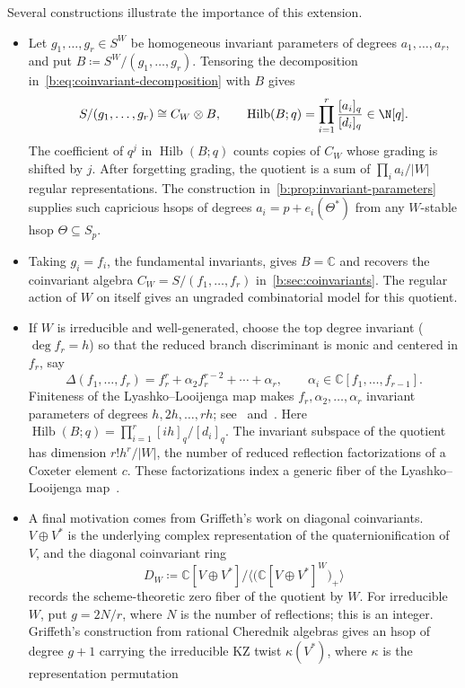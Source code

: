 \documentclass[10pt,a4paper]{amsart}
\newcommand{\defeq}{\coloneqq}
\theoremstyle{definition}
\newcommand{\C}{\mathbb C}\newcommand{\Q}{\mathbb Q}
\DeclareMathOperator{\Hilb}{Hilb}\DeclareMathOperator{\Res}{Res}
\begin{document}
Several constructions illustrate the importance of this extension.
\begin{itemize}
\item Let $g_1,\ldots,g_r\in S^W$ be homogeneous invariant parameters
of degrees $a_1,\ldots,a_r$, and put
$B\defeq S^W/(g_1,\ldots,g_r)$. Tensoring the decomposition
in~\cref{b:eq:coinvariant-decomposition} with $B$ gives
\[
 S/(g_1,\ldots,g_r)\cong C_W\otimes B,\qquad
 \Hilb(B;q)=\prod_{i=1}^r\frac{[a_i]_q}{[d_i]_q}\in\N[q].
\]
The coefficient of $q^j$ in $\Hilb(B;q)$ counts copies of $C_W$
whose grading is shifted by $j$. After forgetting grading, the
quotient is a sum of $\prod_i a_i/|W|$ regular representations.
The construction in~\cref{b:prop:invariant-parameters} supplies such
capricious hsops of degrees $a_i=p+e_i(\Theta^*)$ from any
$W$-stable hsop $\Theta\subseteq S_p$.
\item Taking $g_i=f_i$, the fundamental invariants, gives $B=\C$
and recovers the coinvariant algebra $C_W=S/(f_1,\ldots,f_r)$
in~\cref{b:sec:coinvariants}. The regular action of $W$ on itself
gives an ungraded combinatorial model for this quotient.
\item If $W$ is irreducible and well-generated, choose the top degree
invariant ($\deg f_r=h$) so that the reduced branch discriminant
is monic and centered in $f_r$, say
\[
 \Delta(f_1,\ldots,f_r)
 =f_r^r+\alpha_2f_r^{r-2}+\cdots+\alpha_r,
 \qquad \alpha_i\in\C[f_1,\ldots,f_{r-1}].
\]
Finiteness of the Lyashko--Looijenga map makes
$f_r,\alpha_2,\ldots,\alpha_r$ invariant parameters of degrees
$h,2h,\ldots,rh$; see~\cite[Section~7.2]{EquivariantParameters}
and~\cite[Lemma~4.4]{DouvropoulosLL}.
Here $\Hilb(B;q)=\prod_{i=1}^r[ih]_q/[d_i]_q$.
The invariant subspace of the quotient has dimension $r!h^r/|W|$,
the number of reduced reflection factorizations of a Coxeter element $c$.
These factorizations index a generic fiber of the Lyashko--Looijenga
map~\cite[Theorem~7.20]{Bessis}.
\item A final motivation comes from Griffeth's work on diagonal coinvariants.
$V\oplus V^*$ is the underlying complex representation of the
quaternionification of $V$, and the diagonal coinvariant ring
\[
 D_W\defeq\C[V\oplus V^*]\big/
 \big\langle\bigl(\C[V\oplus V^*]^W\bigr)_+\big\rangle
\]
records the scheme-theoretic zero fiber of the quotient by $W$.
For irreducible $W$, put $g=2N/r$, where $N$ is the number of reflections;
this is an integer. Griffeth's construction from rational Cherednik
algebras gives an hsop of degree $g+1$ carrying the irreducible
KZ twist $\kappa(V^*)$, where $\kappa$ is the representation permutation

\end{itemize}
\end{document}
